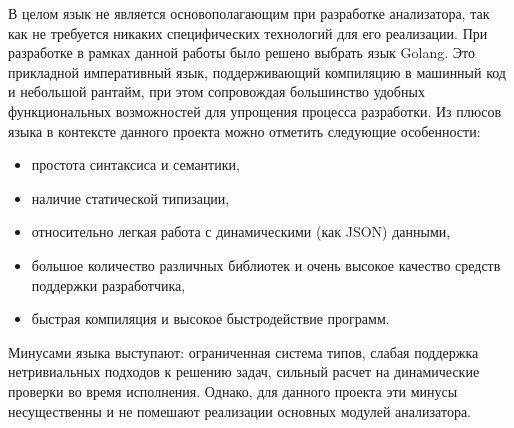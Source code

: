 В целом язык не является основополагающим при разработке анализатора, так как не требуется
никаких специфических технологий для его реализации. При разработке в рамках данной работы
было решено выбрать язык Golang. Это прикладной императивный язык, поддерживающий
компиляцию в машинный код и небольшой рантайм, при этом сопровождая большинство
удобных функциональных возможностей для упрощения процесса разработки.
Из плюсов языка в контексте данного проекта можно отметить следующие особенности:
\begin{itemize}
    \item простота синтаксиса и семантики,
    \item наличие статической типизации,
    \item относительно легкая работа с динамическими (как JSON) данными,
    \item большое количество различных библиотек и очень высокое качество средств поддержки разработчика,
    \item быстрая компиляция и высокое быстродействие программ.
\end{itemize}

Минусами языка выступают: ограниченная система типов, слабая поддержка нетривиальных подходов к решению задач,
сильный расчет на динамические проверки во время исполнения.
Однако, для данного проекта эти минусы несущественны и не помешают реализации
основных модулей анализатора.
\clearpage